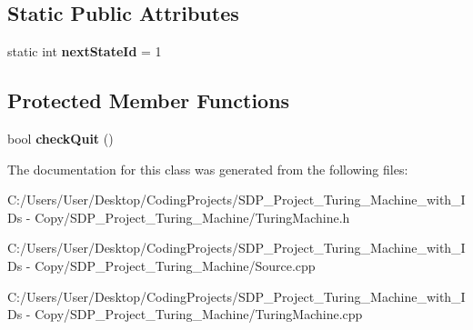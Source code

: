 \subsection*{Static Public Attributes}
\begin{DoxyCompactItemize}
\item 
\mbox{\label{class_turing_machine_ad4eb274038c59c55538865dd34619cb3}} 
static int {\bfseries next\+State\+Id} = 1
\end{DoxyCompactItemize}
\subsection*{Protected Member Functions}
\begin{DoxyCompactItemize}
\item 
\mbox{\label{class_turing_machine_a703130b30c6c8115a9c60ca9b77b3790}} 
bool {\bfseries check\+Quit} ()
\end{DoxyCompactItemize}


The documentation for this class was generated from the following files\+:\begin{DoxyCompactItemize}
\item 
C\+:/\+Users/\+User/\+Desktop/\+Coding\+Projects/\+S\+D\+P\+\_\+\+Project\+\_\+\+Turing\+\_\+\+Machine\+\_\+with\+\_\+\+I\+Ds -\/ Copy/\+S\+D\+P\+\_\+\+Project\+\_\+\+Turing\+\_\+\+Machine/Turing\+Machine.\+h\item 
C\+:/\+Users/\+User/\+Desktop/\+Coding\+Projects/\+S\+D\+P\+\_\+\+Project\+\_\+\+Turing\+\_\+\+Machine\+\_\+with\+\_\+\+I\+Ds -\/ Copy/\+S\+D\+P\+\_\+\+Project\+\_\+\+Turing\+\_\+\+Machine/Source.\+cpp\item 
C\+:/\+Users/\+User/\+Desktop/\+Coding\+Projects/\+S\+D\+P\+\_\+\+Project\+\_\+\+Turing\+\_\+\+Machine\+\_\+with\+\_\+\+I\+Ds -\/ Copy/\+S\+D\+P\+\_\+\+Project\+\_\+\+Turing\+\_\+\+Machine/Turing\+Machine.\+cpp\end{DoxyCompactItemize}
